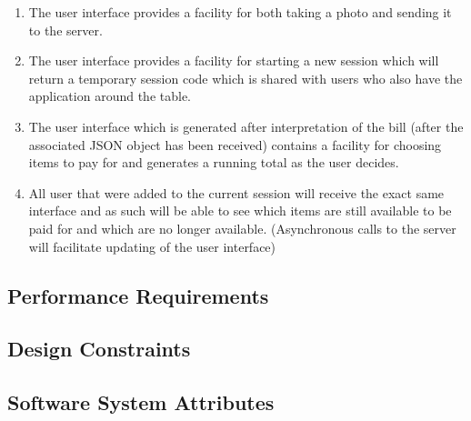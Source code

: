 \documentclass[12pt,a4paper]{article}
\begin{document}
			\begin{enumerate}
				\item The user interface provides a facility for both taking a photo and sending it to the server.
				\item The user interface provides a facility for starting a new session which will return a temporary session code which is shared with users who also have the application around the table.
				\item The user interface which is generated after interpretation of the bill (after the associated JSON object has been received) contains a  facility for choosing items to pay for and generates a running total as the user decides.
				\item All user that were added to the current session will receive the exact same interface and as such will be able to see which items are still available to be paid for and which are no longer available. (Asynchronous calls to the server will facilitate updating of the user interface)
			\end{enumerate}
		
	\subsection{Performance Requirements}
	
	\subsection{Design Constraints}
	
	\subsection{Software System Attributes}
   
\end{document}
